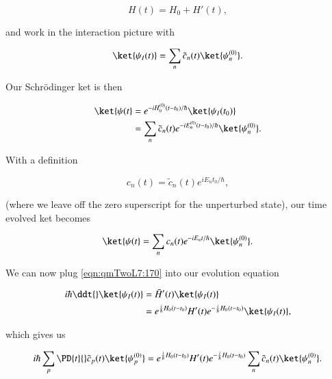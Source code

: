 \begin{equation}\label{eqn:qmTwoL7:150}
H(t) = H_0 + H'(t),
\end{equation}

and work in the interaction picture with

\begin{equation}\label{eqn:qmTwoL7:170}
\ket{\psi_I(t)} = \sum_n \tilde{c}_n(t) \ket{\psi_n^{(0)} }.
\end{equation}

Our Schr\"{o}dinger ket is then

\begin{equation}\label{eqn:qmTwoL7:190}
\begin{aligned}
\ket{\psi(t}
&=
e^{-i H_0^{(0)}(t- t_0)/\hbar}
\ket{\psi_I(t_0) } \\
&=
\sum_n \tilde{c}_n(t)
e^{-i E_n^{(0)}(t- t_0)/\hbar}
\ket{\psi_n^{(0)} }.
\end{aligned}
\end{equation}

With a definition

\begin{equation}\label{eqn:qmTwoL7:210}
c_n(t) = \tilde{c}_n(t) e^{i E_n t_0/\hbar},
\end{equation}

(where we leave off the zero superscript for the unperturbed state), our time evolved ket becomes

\begin{equation}\label{eqn:qmTwoL7:230}
\ket{\psi(t}
=
\sum_n c_n(t)
e^{-i E_n t/\hbar}
\ket{\psi_n^{(0)} }.
\end{equation}

We can now plug \ref{eqn:qmTwoL7:170} into our evolution equation

\begin{align*}
i\hbar \ddt{} \ket{\psi_I(t)}
&=
\bar{H}'(t) \ket{\psi_I(t)} \\
&=
e^{\frac{i}{\hbar} H_0(t - t_0)} H'(t) e^{-\frac{i}{\hbar} H_0(t - t_0)}
\ket{\psi_I(t)},
\end{align*}

which gives us

\begin{equation}\label{eqn:qmTwoL7:250}
i \hbar \sum_p \PD{t}{}
\tilde{c}_p(t) \ket{\psi_p^{(0)} }
=
e^{\frac{i}{\hbar} H_0(t - t_0)} H'(t) e^{-\frac{i}{\hbar} H_0(t - t_0)}
\sum_n
\tilde{c}_n(t) \ket{\psi_n^{(0)} }.
\end{equation}

